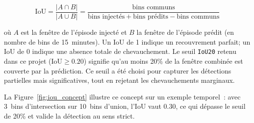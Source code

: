 \begin{equation}
    \text{IoU} = \frac{|A \cap B|}{|A \cup B|}
    = \frac{\text{bins communs}}{\text{bins injectés} + \text{bins prédits} - \text{bins communs}}
\end{equation}

\noindent
où $A$ est la fenêtre de l'épisode injecté et $B$ la fenêtre de l'épisode prédit (en
nombre de bins de 15~minutes). Un IoU de 1 indique un recouvrement parfait; un IoU de 0
indique une absence totale de chevauchement. Le seuil \texttt{IoU20} retenu dans ce projet
($\text{IoU} \geq 0.20$) signifie qu'au moins 20\% de la fenêtre combinée est couverte
par la prédiction. Ce seuil a été choisi pour capturer les détections partielles mais
significatives, tout en rejetant les chevauchements marginaux.

La Figure~\ref{fig:iou_concept} illustre ce concept sur un exemple temporel~: avec
3~bins d'intersection sur 10~bins d'union, l'IoU vaut 0.30, ce qui dépasse le seuil de
20\% et valide la détection au sens strict.

